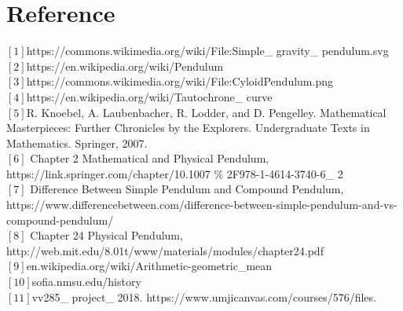 \documentclass[12pt,a4paper]{article}
\begin{document}
\section{Reference}
\begin{flushleft}
$[1]$https://commons.wikimedia.org/wiki/File:Simple\_ gravity\_ pendulum.svg\\
$[2]$https://en.wikipedia.org/wiki/Pendulum\\
$[3]$https://commons.wikimedia.org/wiki/File:CyloidPendulum.png\\
$[4]$https://en.wikipedia.org/wiki/Tautochrone\_ curve\\
$[5]$R. Knoebel, A. Laubenbacher, R. Lodder, and D. Pengelley. Mathematical Masterpieces: Further Chronicles by the Explorers. Undergraduate Texts in Mathematics. Springer, 2007.\\
$[6]$ Chapter 2 Mathematical and Physical Pendulum, https://link.springer.com/chapter/10.1007 $\%$ 2F978-1-4614-3740-6\_ 2\\
$[7]$ Difference Between Simple Pendulum and Compound Pendulum, 
https://www.differencebetween.com/difference-between-simple-pendulum-and-vs-compound-pendulum/\\
$[8]$ Chapter 24 Physical Pendulum, http://web.mit.edu/8.01t/www/materials/modules/chapter24.pdf \\
$[9]$en.wikipedia.org/wiki/Arithmetic-geometric\_mean\\
$[10]$sofia.nmsu.edu/history\\
$[11]$vv285\_ project\_ 2018. https://www.umjicanvas.com/courses/576/files.
\end{flushleft}
\end{document}
